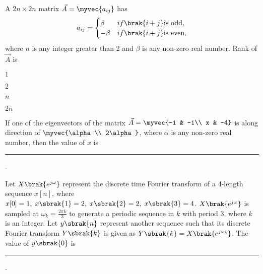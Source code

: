 \item A $2n \times 2n$ matrix $\vec{A}=\myvec{a_{ij}}$ has 
$$
a_{ij} = 
\begin{cases}
    \beta & if \brak{i+j} \text{is odd},\\
    -\beta & if \brak{i+j} \text{is even},
\end{cases}$$
where $n$ is any integer greater than 2 and $\beta$ is any non-zero real number. Rank of $\vec{A}$ is
\hfill{}
\begin{enumerate}
\begin{multicols}{4}
\item $1$
\item $2$
\item $n$
\item $2n$
\end{multicols}
\end{enumerate}
\item If one of the eigenvectors of the matrix 
$\vec{A}=\myvec{-1 & -1\\ x & -4}$
is along direction of $\myvec{\alpha \\ 2\alpha}$, where $\alpha$ is any non-zero real number, then the value of $x$ is \rule{1cm}{0.01pt}.\hfill{}
\item Let $X\brak{e^{j\omega}}$ represent the discrete time Fourier transform of a 4-length sequence $x[n]$, where $x[0]=1,\;x\sbrak{1}=2,\;x\sbrak{2}=2,\;x\sbrak{3}=4$. $X\brak{e^{j\omega}}$ is sampled at $\omega_k=\frac{2\pi k}{3}$ to generate a periodic sequence in $k$ with period $3$, where $k$ is an integer. Let $y\sbrak{n}$ represent another sequence such that its discrete Fourier transform $Y\sbrak{k}$ is given as $Y\sbrak{k} =X\brak{e^{j\omega_k}}$. The value of $y\sbrak{0}$ is \rule{1cm}{0.01pt}. \hfill{}
